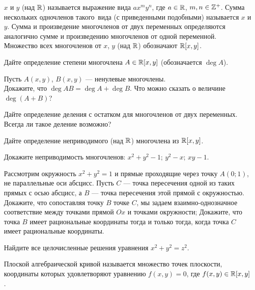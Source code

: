 \documentclass[a4paper,12pt]{article}
\begin{document}

  \/ $x$ и $y$ (над $\mathbb{R}$)
называется выражение
вида $ax^my^n$, где $a\in\mathbb{R}$, $m,n\in\mathbb{Z}^+$.
Сумма нескольких одночленов такого~вида
(с приведенными подобными)
называется \/ $x$ и $y$.
Сумма и произведение многочленов от двух переменных определяются аналогично
сумме и произведению многочленов от одной переменной.
Множество всех многочленов от $x$, $y$ (над $\mathbb{R}$) обозначают $\mathbb{R}[x,y]$.

 Дайте определение степени многочлена  $A\in\mathbb{R}[x,y]$
(обозначается $\deg A$).

 Пусть $A(x,y)$, $B(x,y)$ --- ненулевые многочлены.\\
 Докажите, что $\deg AB=\deg A+\deg B$.
 Что можно сказать о величине $\deg (A+B)$?

 Дайте определение
деления с остатком для многочленов от двух переменных.
Всегда ли такое деление возможно?

 Дайте определение неприводимого (над $\mathbb{R}$)
многочлена из $\mathbb{R}[x,y]$. %

 Докажите неприводимость многочленов:
 $x^2+y^2-1$;  $y^2-x$;  $xy-1$.


Рассмотрим окружность $x^2 + y^2 = 1$ и прямые проходящие через точку $A (0;1)$, не параллельные оси абсцисс. Пусть $C$ --- точка пересечения одной из таких прямых с осью абсцисс, а $B$ --- точка пересечения этой прямой с окружностью.
  Докажите, что сопоставляя точку $B$ точке $C$, мы задаем взаимно-однозначное соответствие между точками прямой $Ox$ и точками окружности;
 Докажите, что точка $B$ имеет рациональные координаты тогда и только тогда, когда точка $C$ имеет рациональные координаты.

Найдите все целочисленные решения уравнения $x^2 + y^2 = z^2.$

Плоской алгебраической кривой называется множество точек плоскости, координаты которых удовлетворяют уравнению $f(x,y) = 0$, где $f(x,y) \in \mathbb{R}[x,y]$.
\end{document}
